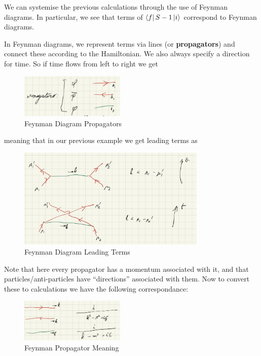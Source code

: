 \documentclass{article}
\theoremstyle{definition}
\begin{document}
We can systemise the previous calculations through the use of Feynman diagrams.
In particular, we see that terms of $\bra{f} S - 1 \ket{i}$ correspond to
Feynman diagrams.

In Feynman diagrams, we represent terms via lines (or \textbf{propagators}) and
connect these according to the Hamiltonian. We also always specify a direction
for time. So if time flows from left to right we get

\begin{figure}[H]
  \centering
  \includegraphics[width=5cm]{res/QFT/feynman_propagators}
  \caption{Feynman Diagram Propagators}
  \label{feynman_propagators}
\end{figure}

meaning that in our previous example we get leading terms as

\begin{figure}[H]
  \centering
  \includegraphics[width=9cm]{res/QFT/feynman_example}
  \caption{Feynman Diagram Leading Terms}
  \label{feynman_example}
\end{figure}

Note that here every propagator has a momentum associated with it, and that
particles/anti-particles have ``directions'' associated with them. Now to
convert these to calculations we have the following correspondance:

\begin{figure}[H]
  \centering
  \includegraphics[width=5cm]{res/QFT/feynman_correspondance}
  \caption{Feynman Propagator Meaning}
  \label{feynman_correspondance}
\end{figure}
\end{document}
